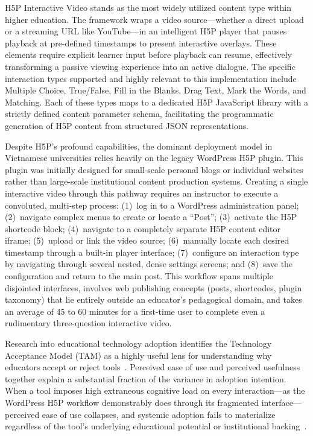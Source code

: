 H5P Interactive Video stands as the most widely utilized content type within higher education. The framework wraps a video source—whether a direct upload or a streaming URL like YouTube—in an intelligent H5P player that pauses playback at pre-defined timestamps to present interactive overlays. These elements require explicit learner input before playback can resume, effectively transforming a passive viewing experience into an active dialogue. The specific interaction types supported and highly relevant to this implementation include Multiple Choice, True/False, Fill in the Blanks, Drag Text, Mark the Words, and Matching. Each of these types maps to a dedicated H5P JavaScript library with a strictly defined content parameter schema, facilitating the programmatic generation of H5P content from structured JSON representations.

Despite H5P's profound capabilities, the dominant deployment model in Vietnamese universities relies heavily on the legacy WordPress H5P plugin. This plugin was initially designed for small-scale personal blogs or individual websites rather than large-scale institutional content production systems. Creating a single interactive video through this pathway requires an instructor to execute a convoluted, multi-step process: (1)~log in to a WordPress administration panel; (2)~navigate complex menus to create or locate a ``Post''; (3)~activate the H5P shortcode block; (4)~navigate to a completely separate H5P content editor iframe; (5)~upload or link the video source; (6)~manually locate each desired timestamp through a built-in player interface; (7)~configure an interaction type by navigating through several nested, dense settings screens; and (8)~save the configuration and return to the main post. This workflow spans multiple disjointed interfaces, involves web publishing concepts (posts, shortcodes, plugin taxonomy) that lie entirely outside an educator's pedagogical domain, and takes an average of 45 to 60 minutes for a first-time user to complete even a rudimentary three-question interactive video.

Research into educational technology adoption identifies the Technology Acceptance Model (TAM) as a highly useful lens for understanding why educators accept or reject tools~\cite{davis1989}. Perceived ease of use and perceived usefulness together explain a substantial fraction of the variance in adoption intention. When a tool imposes high extraneous cognitive load on every interaction---as the WordPress H5P workflow demonstrably does through its fragmented interface---perceived ease of use collapses, and systemic adoption fails to materialize regardless of the tool's underlying educational potential or institutional backing~\cite{sweller1988,chandler1991}.

